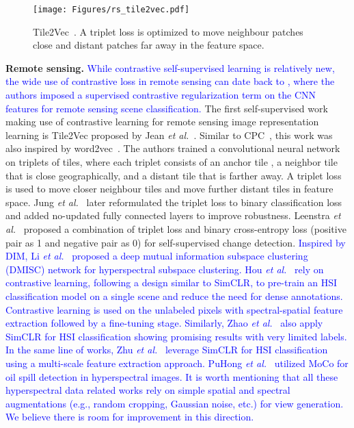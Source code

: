 \documentclass[lettersize,journal]{IEEEtran}
\newcommand{\etal}{\textit{et al.}}
\begin{document}
\begin{figure}
\centering
\texttt{[image: Figures/rs\_tile2vec.pdf]}
\caption[tile2vec]{Tile2Vec~\cite{jean2019tile2vec}. A triplet loss is optimized to move neighbour patches close and distant patches far away in the feature space.}
\label{fig:tile2vec}
\end{figure}

\textbf{Remote sensing.} \textcolor{blue}{While contrastive self-supervised learning is relatively new, the wide use of contrastive loss in remote sensing \cite{zhang2022semisupervised,yang2022laboratory,rao2022transferable,jing2022radar,zhang2020unsupervised,geng2022multi} can date back to \cite{cheng2018deep}, where the authors imposed a supervised contrastive regularization term on the CNN features for remote sensing scene classification.} 
The first self-supervised work making use of contrastive learning for remote sensing image representation learning is Tile2Vec proposed by Jean \etal~\cite{jean2019tile2vec}. Similar to CPC~\cite{oord2018representation}, this work was also inspired by word2vec~\cite{mikolov2013efficient,mikolov2013distributed}. The authors trained a convolutional neural network on triplets of tiles, where each triplet consists of an anchor tile , a neighbor tile  that is close geographically, and a distant tile  that is farther away. A triplet loss is used to move closer neighbour tiles and move further distant tiles in feature space. Jung \etal~\cite{jung2021self} later reformulated the triplet loss to binary classification loss and added no-updated fully connected layers to improve robustness. Leenstra \etal~\cite{leenstra2021self} proposed a combination of triplet loss and binary cross-entropy loss (positive pair as 1 and negative pair as 0) for self-supervised change detection.
\textcolor{blue}{Inspired by DIM, Li \etal~\cite{li2022deep} proposed a deep mutual information subspace clustering (DMISC) network for hyperspectral subspace clustering. Hou \etal~ \cite{hou2021hyperspectral} rely on contrastive learning, following a design similar to SimCLR, to pre-train an HSI classification model on a single scene and reduce the need for dense annotations. Contrastive learning is used on the unlabeled pixels with spectral-spatial feature extraction followed by a fine-tuning stage. Similarly, Zhao \etal~ \cite{zhao2022hyperspectral} also apply SimCLR for HSI classification showing promising results with very limited labels. In the same line of works, Zhu \etal~ \cite{zhu2021sc} leverage SimCLR for HSI classification using a multi-scale feature extraction approach. PuHong \etal~ \cite{duan2022self} utilized MoCo for oil spill detection in hyperspectral images. It is worth mentioning that all these hyperspectral data related works rely on simple spatial and spectral augmentations (e.g., random cropping, Gaussian noise, etc.) for view generation. We believe there is room for improvement in this direction.}
\end{document}
